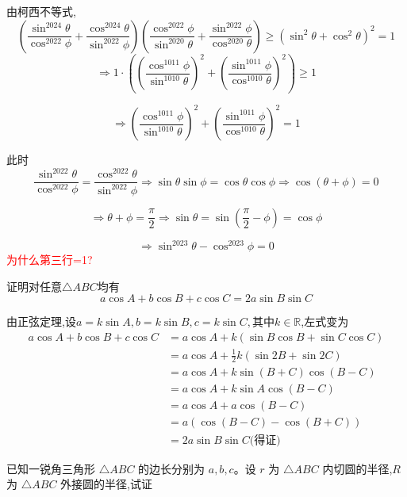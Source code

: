 \begin{questions}
    \begin{solution}
        由柯西不等式,
\[
\left(\frac{\sin^{2024}\theta}{\cos^{2022}\phi}+\frac{\cos^{2024}\theta}{\sin^{2022}\phi}\right)\left(\frac{\cos^{2022} \phi}{\sin^{2020} \theta} + \frac{\sin^{2022} \phi}{\cos^{2020} \theta}\right) \ge (\sin^2 \theta + \cos^2 \theta)^2 =1
\]
\[
\Rightarrow 1\cdot \left( \left(\frac{\cos^{1011} \phi}{\sin^{1010} \theta} \right)^2+ \left(\frac{\sin^{1011} \phi}{\cos^{1010} \theta} \right)^2 \right) \ge 1
\]

\[
\Rightarrow \left(\frac{\cos^{1011} \phi}{\sin^{1010} \theta} \right)^2+ \left(\frac{\sin^{1011} \phi}{\cos^{1010} \theta} \right)^2 = 1
\]

此时
\[
\frac{\sin ^{2022}\theta}{\cos^{2022}\phi} = \frac{\cos^{2022} \theta}{\sin^{2022} \phi} \Rightarrow \sin\theta \sin \phi = \cos \theta \cos \phi \Rightarrow \cos(\theta+\phi)=0
\]

\[
\Rightarrow \theta+\phi =\frac{\pi}{2} \Rightarrow \sin \theta= \sin\left(\frac{\pi}{2}-\phi\right)= \cos \phi
\]

\[
\Rightarrow \sin^{2023} \theta-\cos^{2023} \phi = 0
\]
\textcolor{red}{为什么第三行=1?}
\end{solution}

    \question 证明对任意\(\triangle ABC\)均有  
        \[
        a\cos A + b\cos B + c\cos C = 2a\sin B\sin C\]
    \begin{solution}
        由正弦定理,设$a=k\sin A, b=k\sin B, c=k \sin C,$其中$k\in \mathbb{R}$,左式变为\begin{align*}
            a\cos A + b\cos B + c\cos C
            &=a\cos A+ k(\sin B \cos B+\sin C \cos C)\\
            &=a\cos A+ \frac{1}{2}k(\sin 2B+\sin 2C)\\
            &=a\cos A+ k\sin(B+C)\cos(B-C)\\
            &=a\cos A+ k\sin A\cos(B-C)\\
            &=a\cos A+ a\cos(B-C)\\
            &=a(\cos(B-C)-\cos (B+C))\\
            &=2a\sin B\sin C \text{(得证)}
        \end{align*}
    \end{solution}

    \question 已知一锐角三角形 $\triangle ABC$ 的边长分别为 $a,b,c$。设 $r$ 为 $\triangle ABC$ 内切圆的半径,$R$ 为 $\triangle ABC$ 外接圆的半径,试证
    \begin{parts}

\end{parts}
\end{questions}
